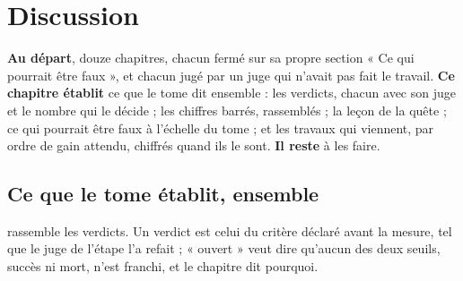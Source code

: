 
\chapter{Discussion}\label{t3dis:ch}

\begin{origine}
\textbf{Au départ}, douze chapitres, chacun fermé sur sa propre section « Ce qui pourrait être faux », et chacun jugé par un juge qui n'avait pas fait le travail.
\textbf{Ce chapitre établit} ce que le tome dit ensemble : les verdicts, chacun avec son juge et le nombre qui le décide ; les chiffres barrés, rassemblés ; la leçon de la quête ; ce qui pourrait être faux à l'échelle du tome ; et les travaux qui viennent, par ordre de gain attendu, chiffrés quand ils le sont.
\textbf{Il reste} à les faire.
\end{origine}

\section{Ce que le tome établit, ensemble}\label{t3dis:sec:bilan}

 rassemble les verdicts. Un verdict est celui du critère déclaré avant la mesure, tel que le juge de l'étape l'a refait ; « ouvert » veut dire qu'aucun des deux seuils, succès ni mort, n'est franchi, et le chapitre dit pourquoi.

